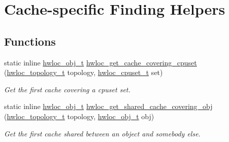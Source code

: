 \hypertarget{group__hwlocality__helper__find__cache}{
\section{Cache-\/specific Finding Helpers}
\label{group__hwlocality__helper__find__cache}
}
\subsection*{Functions}
\begin{DoxyCompactItemize}
\item 
static inline \hyperlink{structhwloc__obj}{hwloc\_\-obj\_\-t} \hyperlink{group__hwlocality__helper__find__cache_ga5e56e841b6887dc596214965d379781e}{hwloc\_\-get\_\-cache\_\-covering\_\-cpuset} (\hyperlink{group__hwlocality__topology_ga9d1e76ee15a7dee158b786c30b6a6e38}{hwloc\_\-topology\_\-t} topology, \hyperlink{group__hwlocality__cpuset_ga7366332f7090f5b54d4b25a0c2c4b411}{hwloc\_\-cpuset\_\-t} set)
\begin{DoxyCompactList}\small\item\em Get the first cache covering a cpuset {\ttfamily set}. \item\end{DoxyCompactList}\item 
static inline \hyperlink{structhwloc__obj}{hwloc\_\-obj\_\-t} \hyperlink{group__hwlocality__helper__find__cache_gaefe0e3eda6f6bfb9bdcd9c62f4e88066}{hwloc\_\-get\_\-shared\_\-cache\_\-covering\_\-obj} (\hyperlink{group__hwlocality__topology_ga9d1e76ee15a7dee158b786c30b6a6e38}{hwloc\_\-topology\_\-t} topology, \hyperlink{structhwloc__obj}{hwloc\_\-obj\_\-t} obj)
\begin{DoxyCompactList}\small\item\em Get the first cache shared between an object and somebody else. \item\end{DoxyCompactList}\end{DoxyCompactItemize}



